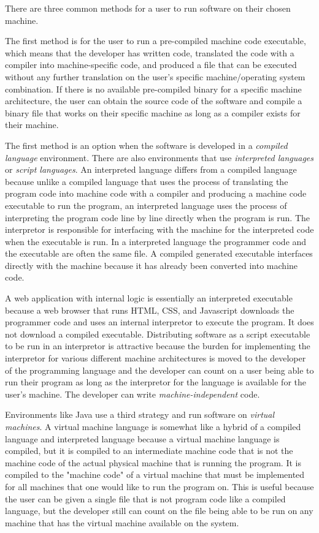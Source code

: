There are three common methods for a user to run software on their chosen machine.

The first method is for the user to run a pre-compiled machine code executable, which means that the developer has written code, translated the code with a compiler into machine-specific code, and produced a file that can be executed without any further translation on the user's specific machine/operating system combination. If there is no available pre-compiled binary for a specific machine architecture, the user can obtain the source code of the software and compile a binary file that works on their specific machine as long as a compiler exists for their machine.

The first method is an option when the software is developed in a \emph{compiled language} environment. There are also environments that use \emph{interpreted languages} or \emph{script languages}. An interpreted language differs from a compiled language because unlike a compiled language that uses the process of translating the program code into machine code with a compiler and producing a machine code executable to run the program, an interpreted language uses the process of interpreting the program code line by line directly when the program is run. The interpretor is responsible for interfacing with the machine for the interpreted code when the executable is run. In a interpreted language the programmer code and the executable are often the same file. A compiled generated executable interfaces directly with the machine because it has already been converted into machine code. 

A web application with internal logic is essentially an interpreted executable because a web browser that runs HTML, CSS, and Javascript downloads the programmer code and uses an internal interpretor to execute the program. It does not download a compiled executable. Distributing software as a script executable to be run in an interpretor is attractive because the burden for implementing the interpretor for various different machine architectures is moved to the developer of the programming language and the developer can count on a user being able to run their program as long as the interpretor for the language is available for the user's machine. The developer can write \emph{machine-independent} code.

Environments like Java use a third strategy and run software on \emph{virtual machines}. A virtual machine language is somewhat like a hybrid of a compiled language and interpreted language because a virtual machine language is compiled, but it is compiled to an intermediate machine code that is not the machine code of the actual physical machine that is running the program. It is compiled to the "machine code" of a virtual machine that must be implemented for all machines that one would like to run the program on. This is useful because the user can be given a single file that is not program code like a compiled language, but the developer still can count on the file being able to be run on any machine that has the virtual machine available on the system.

